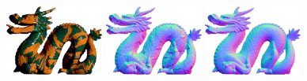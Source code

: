 \vspace{5.2em}
\\
\includegraphics[width=0.24\textwidth]{ch-psfcn/images/Results/Synth_Test/SVBRDF/1_38_0_2.0._4.0.png}\hspace{-0.3em}
\includegraphics[width=0.24\textwidth]{ch-psfcn/images/Results/Synth_Test/SVBRDF/PS-FCN_38_4_4.0.png}\hspace{-0.3em}
\includegraphics[width=0.24\textwidth]{ch-psfcn/images/Results/Synth_Test/SVBRDF/1_38_4_4.0.png}
\vspace{-6.5em}
\\
\makebox[0.24\textwidth]{\footnotesize \hfill } 
\vspace{5.2em}
\\
\\
